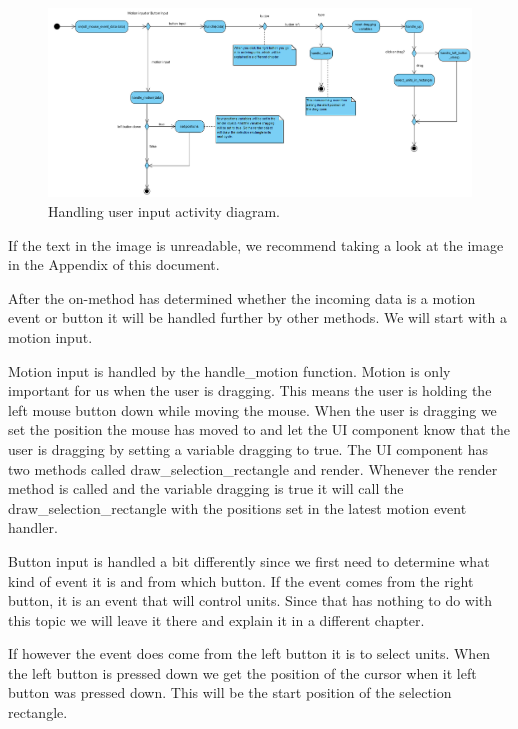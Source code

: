 \begin{figure}[!htb]
    \centering
    \includegraphics[scale=0.55]{images/ActivityDiagramMouseHandler.PNG}
    \caption{Handling user input activity diagram.}\label{fig:fuzzy-distance}
\end{figure}

If the text in the image is unreadable, we recommend taking a look at the image in the Appendix of this document.

After the on-method has determined whether the incoming data is a motion event or button it will be handled further by other methods. We will start with a motion input.

Motion input is handled by the handle\_motion function. Motion is only important for us when the user is dragging. This means the user is holding the left mouse button down while moving the mouse. When the user is dragging we set the position the mouse has moved to and let the UI component know that the user is dragging by setting a variable dragging to true. The UI component has two methods called draw\_selection\_rectangle and render. Whenever the render method is called and the variable dragging is true it will call the draw\_selection\_rectangle with the positions set in the latest motion event handler.

Button input is handled a bit differently since we first need to determine what kind of event it is and from which button. If the event comes from the right button, it is an event that will control units. Since that has nothing to do with this topic we will leave it there and explain it in a different chapter. 

If however the event does come from the left button it is to select units. When the left button is pressed down we get the position of the cursor when it left button was pressed down. This will be the start position of the selection rectangle.   

